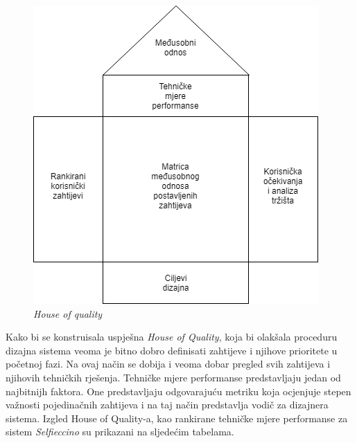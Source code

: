 \documentclass[12pt]{article}
\begin{document}
\begin{figure}[!h]
\centering
\includegraphics[scale=0.8]{hoq}
\caption{\textit{House of quality}}
\label{hoq}
\end{figure}
 
Kako bi se konstruisala uspje\v{s}na \textit{House of Quality}, koja bi olak\v{s}ala proceduru dizajna sistema veoma je bitno dobro definisati zahtijeve i njihove prioritete u po\v{c}etnoj fazi. Na ovaj na\v{c}in se dobija i veoma dobar pregled svih zahtijeva i njihovih tehni\v{c}kih rje\v{s}enja. Tehni\v{c}ke mjere performanse predstavljaju jedan od najbitnijh faktora. One predstavljaju odgovaraju\'cu metriku koja ocjenjuje stepen va\v{z}nosti pojedina\v{c}nih zahtijeva i na taj na\v{c}in predstavlja vodi\v{c} za dizajnera sistema. Izgled House of Quality-a, kao rankirane tehni\v{c}ke mjere performanse za sistem \textit{Selfieccino} su prikazani na sljede\'cim tabelama. 
\end{document}
